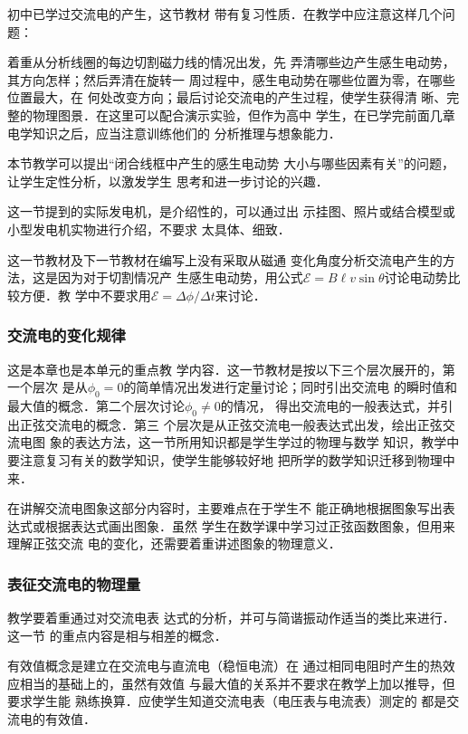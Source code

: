 初中已学过交流电的产生，这节教材
带有复习性质．在教学中应注意这样几个问题：

着重从分析线圈的每边切割磁力线的情况出发，先
弄清哪些边产生感生电动势，其方向怎样；然后弄清在旋转一
周过程中，感生电动势在哪些位置为零，在哪些位置最大，在
何处改变方向；最后讨论交流电的产生过程，使学生获得清
晰、完整的物理图景．在这里可以配合演示实验，但作为高中
学生，在已学完前面几章电学知识之后，应当注意训练他们的
分析推理与想象能力．

本节教学可以提出“闭合线框中产生的感生电动势
大小与哪些因素有关”的问题，让学生定性分析，以激发学生
思考和进一步讨论的兴趣．

这一节提到的实际发电机，是介绍性的，可以通过出
示挂图、照片或结合模型或小型发电机实物进行介绍，不要求
太具体、细致．

这一节教材及下一节教材在编写上没有采取从磁通
变化角度分析交流电产生的方法，这是因为对于切割情况产
生感生电动势，用公式$\mathcal{E}=B\ell v\sin\theta$讨论电动势比较方便．教
学中不要求用$\mathcal{E}=\Delta\phi/\Delta t$来讨论．

\subsubsection{交流电的变化规律}

这是本章也是本单元的重点教
学内容．这一节教材是按以下三个层次展开的，第一个层次
是从$\phi_0=0$的简单情况出发进行定量讨论；同时引出交流电
的瞬时值和最大值的概念．第二个层次讨论$\phi_0\ne 0$的情况，
得出交流电的一般表达式，并引出正弦交流电的概念．第三
个层次是从正弦交流电一般表达式出发，绘出正弦交流电图
象的表达方法，这一节所用知识都是学生学过的物理与数学
知识，教学中要注意复习有关的数学知识，使学生能够较好地
把所学的数学知识迁移到物理中来．

在讲解交流电图象这部分内容时，主要难点在于学生不
能正确地根据图象写出表达式或根据表达式画出图象．虽然
学生在数学课中学习过正弦函数图象，但用来理解正弦交流
电的变化，还需要着重讲述图象的物理意义．

\subsubsection{表征交流电的物理量}

教学要着重通过对交流电表
达式的分析，并可与简谐振动作适当的类比来进行．这一节
的重点内容是相与相差的概念．

有效值概念是建立在交流电与直流电（稳恒电流）在
通过相同电阻时产生的热效应相当的基础上的，虽然有效值
与最大值的关系并不要求在教学上加以推导，但要求学生能
熟练换算．应使学生知道交流电表（电压表与电流表）测定的
都是交流电的有效值．


